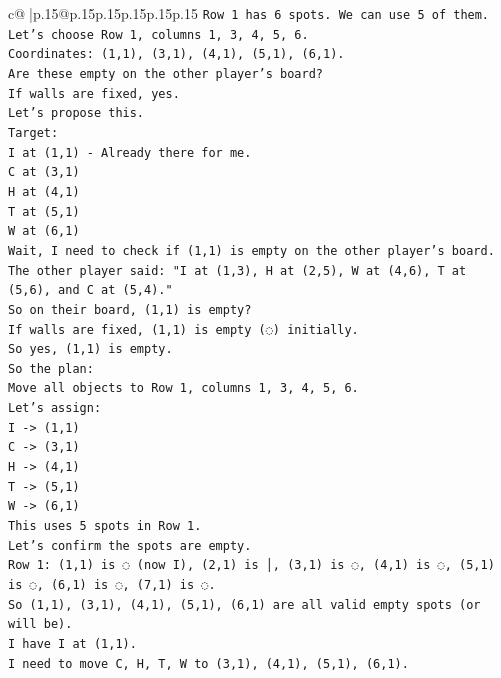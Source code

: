 \documentclass{article}
\begin{document}
{\begin{supertabular}{c@{$\;$}|p{.15\linewidth}@{}p{.15\linewidth}p{.15\linewidth}p{.15\linewidth}p{.15\linewidth}p{.15\linewidth}}
{{{\texttt{Row 1 has 6 spots. We can use 5 of them.} \\
\texttt{Let's choose Row 1, columns 1, 3, 4, 5, 6.} \\
\texttt{Coordinates: (1,1), (3,1), (4,1), (5,1), (6,1).} \\
\texttt{Are these empty on the other player's board?} \\
\texttt{If walls are fixed, yes.} \\
\texttt{Let's propose this.} \\
\texttt{Target:} \\
\texttt{I at (1,1) {-} Already there for me.} \\
\texttt{C at (3,1)} \\
\texttt{H at (4,1)} \\
\texttt{T at (5,1)} \\
\texttt{W at (6,1)} \\
\texttt{Wait, I need to check if (1,1) is empty on the other player's board.} \\
\texttt{The other player said: "I at (1,3), H at (2,5), W at (4,6), T at (5,6), and C at (5,4)."} \\
\texttt{So on their board, (1,1) is empty?} \\
\texttt{If walls are fixed, (1,1) is empty (◌) initially.} \\
\texttt{So yes, (1,1) is empty.} \\
\texttt{So the plan:} \\
\texttt{Move all objects to Row 1, columns 1, 3, 4, 5, 6.} \\
\texttt{Let's assign:} \\
\texttt{I {-}> (1,1)} \\
\texttt{C {-}> (3,1)} \\
\texttt{H {-}> (4,1)} \\
\texttt{T {-}> (5,1)} \\
\texttt{W {-}> (6,1)} \\
\texttt{This uses 5 spots in Row 1.} \\
\texttt{Let's confirm the spots are empty.} \\
\texttt{Row 1: (1,1) is ◌ (now I), (2,1) is │, (3,1) is ◌, (4,1) is ◌, (5,1) is ◌, (6,1) is ◌, (7,1) is ◌.} \\
\texttt{So (1,1), (3,1), (4,1), (5,1), (6,1) are all valid empty spots (or will be).} \\
\texttt{I have I at (1,1).} \\
\texttt{I need to move C, H, T, W to (3,1), (4,1), (5,1), (6,1).} \\
}}}
\end{supertabular}}
\end{document}

